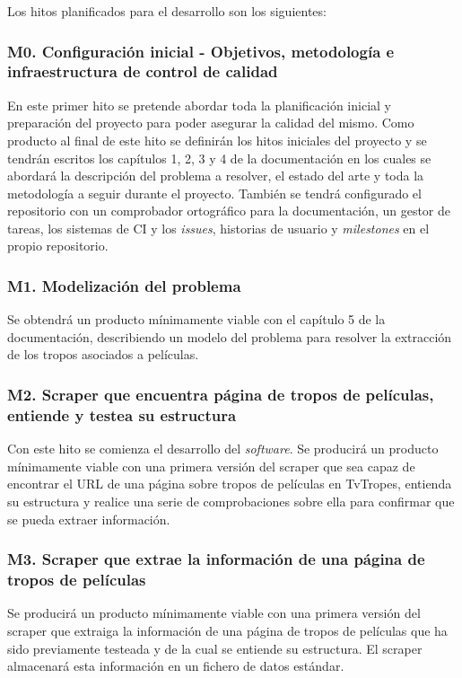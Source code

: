Los hitos planificados para el desarrollo son los siguientes:

\subsubsection{M0. Configuración inicial - Objetivos, metodología e infraestructura de control de calidad}
En este primer hito se pretende abordar toda la planificación inicial y
preparación del proyecto para poder asegurar la calidad del mismo. Como producto
al final de este hito se definirán los hitos iniciales del proyecto y se tendrán
escritos los capítulos 1, 2, 3 y 4 de la documentación en los cuales se abordará
la descripción del problema a resolver, el estado del arte y toda la metodología
a seguir durante el proyecto. También se tendrá configurado el repositorio con
un comprobador ortográfico para la documentación, un gestor de tareas, los
sistemas de CI y los \textit{issues}, historias de usuario y \textit{milestones}
en el propio repositorio.

\subsubsection{M1. Modelización del problema}
Se obtendrá un producto mínimamente viable con el capítulo 5 de la
documentación, describiendo un modelo del problema para resolver la extracción
de los tropos asociados a películas.


\subsubsection{M2. Scraper que encuentra página de tropos de películas, entiende y testea su estructura}
Con este hito se comienza el desarrollo del \textit{software}. Se producirá un
producto mínimamente viable con una primera versión del scraper que sea capaz de
encontrar el URL de una página sobre tropos de películas en TvTropes, entienda
su estructura y realice una serie de comprobaciones sobre ella para confirmar
que se pueda extraer información.

\subsubsection{M3. Scraper que extrae la información de una página de tropos de películas}
Se producirá un producto mínimamente viable con una primera versión del scraper
que extraiga la información de una página de tropos de películas que ha sido
previamente testeada y de la cual se entiende su estructura. El scraper
almacenará esta información en un fichero de datos estándar.

